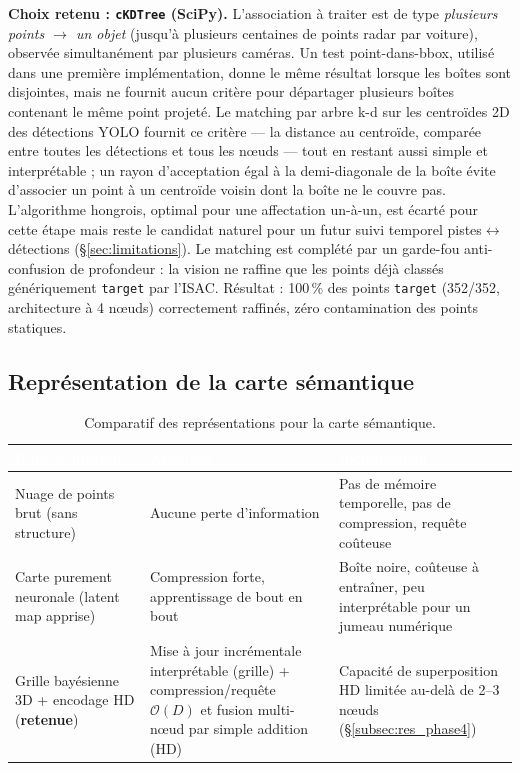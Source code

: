 \documentclass[12pt,a4paper,titlepage]{article}
\newcommand{\hd}[1]{\textcolor{white}{\textbf{#1}}}
\newcommand{\choix}{\rowcolor{tabchoice}}
\begin{document}
\textbf{Choix retenu : \texttt{cKDTree} (SciPy).} L'association à traiter est de type \textit{plusieurs points $\to$ un objet} (jusqu'à plusieurs centaines de points radar par voiture), observée simultanément par plusieurs caméras. Un test point-dans-bbox, utilisé dans une première implémentation, donne le même résultat lorsque les boîtes sont disjointes, mais ne fournit aucun critère pour départager plusieurs boîtes contenant le même point projeté. Le matching par arbre k-d sur les centroïdes 2D des détections YOLO fournit ce critère --- la distance au centroïde, comparée entre toutes les détections et tous les n\oe uds --- tout en restant aussi simple et interprétable ; un rayon d'acceptation égal à la demi-diagonale de la boîte évite d'associer un point à un centroïde voisin dont la boîte ne le couvre pas. L'algorithme hongrois, optimal pour une affectation un-à-un, est écarté pour cette étape mais reste le candidat naturel pour un futur suivi temporel pistes$\leftrightarrow$détections (\S\ref{sec:limitations}). Le matching est complété par un garde-fou anti-confusion de profondeur : la vision ne raffine que les points déjà classés génériquement \texttt{target} par l'ISAC. Résultat : 100\,\% des points \texttt{target} (352/352, architecture à 4 n\oe uds) correctement raffinés, zéro contamination des points statiques.

\subsection{Représentation de la carte sémantique}

\begin{table}[H]
    \centering
    \caption{Comparatif des représentations pour la carte sémantique.}
    \begin{tabularx}{\textwidth}{F{3.8cm}LL}
        \toprule
        \hd{Représentation} & \hd{Avantage} & \hd{Inconvénient} \\
        \midrule
        Nuage de points brut (sans structure) & Aucune perte d'information & Pas de mémoire temporelle, pas de compression, requête coûteuse \\
        Carte purement neuronale (latent map apprise) & Compression forte, apprentissage de bout en bout & Boîte noire, coûteuse à entraîner, peu interprétable pour un jumeau numérique \\
        \choix Grille bayésienne 3D + encodage HD (\textbf{retenue}) & Mise à jour incrémentale interprétable (grille) + compression/requête $\mathcal{O}(D)$ et fusion multi-n\oe ud par simple addition (HD) & Capacité de superposition HD limitée au-delà de 2--3 n\oe uds (\S\ref{subsec:res_phase4}) \\
        \bottomrule
    \end{tabularx}
\end{table}
\end{document}
